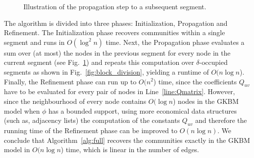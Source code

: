 \documentclass[letterpaper,11pt]{article}
\theoremstyle{definition}
\numberwithin{equation}{section}
\theoremstyle{definition}
\numberwithin{equation}{section}
\theoremstyle{thmstyletwo}%
\begin{document}
\begin{figure}
\centering
{}
\caption{Illustration of the propagation step to a subsequent segment.}
\label{fig:pro}
\end{figure}

The algorithm is divided into three phases: Initialization, Propagation and Refinement. The Initialization phase recovers communities within a single segment and runs in $O(\log^2 n)$ time.
Next, the Propagation phase evaluates a sum over (at most) the nodes in the previous segment for every node in the current segment (see Fig.~\ref{fig:pro}) and repeats this computation over $\delta$-occupied segments as shown in Fig.~\ref{fig:block_division},
yielding a runtime of $O(n \log n$).
Finally, the Refinement phase can run up to $O(n^2$) time, since the coefficients $Q_{uv}$ have to be evaluated for every pair of nodes in Line~\ref{line:Qmatrix}.
However, since the neighbourhood of every node contains $O(\log n$) nodes in the GKBM model when $\phi$ has a bounded support,
using more economical data structures (such as, adjacency lists) the computation of the constants $Q_{uv}$ and therefore the running time of the Refinement phase can be improved to $O(n\log n)$.
We conclude that Algorithm~\ref{alg:full} recovers the communities exactly in the GKBM model in $O(n \log n$) time, which is linear in the number of edges.
\end{document}
